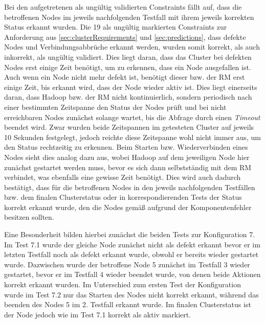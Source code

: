 Bei den aufgetretenen als ungültig validierten Constraints fällt auf, dass die betroffenen Nodes im jeweils nachfolgenden Testfall mit ihrem jeweils korrekten Status erkannt wurden.
Die 19 als ungültig markierten Constraints zur Anforderung aus \autoref{sec:clusterRequirements} und \autoref{sec:predictions}, dass defekte Nodes und Verbindungsabbrüche erkannt werden, wurden somit korrekt, als auch inkorrekt, als ungültig validiert.
Dies liegt daran, dass das Cluster bei defekten Nodes erst einige Zeit benötigt, um zu erkennen, dass ein Node ausgefallen ist.
Auch wenn ein Node nicht mehr defekt ist, benötigt dieser bzw. der \ac{RM} erst einige Zeit, bis erkannt wird, dass der Node wieder aktiv ist.
Dies liegt einerseits daran, dass Hadoop bzw. der \ac{RM} nicht kontinuierlich, sondern periodisch nach einer bestimmten Zeitspanne den Status der Nodes prüft und bei nicht erreichbaren Nodes zunächst solange wartet, bis die Abfrage durch einen \emph{Timeout} beendet wird.
Zwar wurden beide Zeitspannen im getesteten Cluster auf jeweils 10 Sekunden festgelegt, jedoch reichte diese Zeitspanne wohl nicht immer aus, um den Status rechtzeitig zu erkennen.
Beim Starten bzw. Wiederverbinden eines Nodes sieht dies analog dazu aus, wobei Hadoop auf dem jeweiligen Node hier zunächst gestartet werden muss, bevor es sich dann selbstständig mit dem \ac{RM} verbindet, was ebenfalls eine gewisse Zeit benötigt.
Dies wird auch dadurch bestätigt, dass für die betroffenen Nodes in den jeweils nachfolgenden Testfällen bzw. dem finalen Clusterstatus oder in korrespondierenden Tests der Status korrekt erkannt wurde, den die Nodes gemäß aufgrund der Komponentenfehler besitzen sollten.

Eine Besonderheit bilden hierbei zunächst die beiden Tests zur Konfiguration 7.
Im Test 7.1 wurde der gleiche Node zunächst nicht als defekt erkannt bevor er im letzten Testfall noch als defekt erkannt wurde, obwohl er bereits wieder gestartet wurde.
Dazwischen wurde der betroffene Node 5 zunächst im Testfall 3 wieder gestartet, bevor er im Testfall 4 wieder beendet wurde, von denen beide Aktionen korrekt erkannt wurden.
Im Unterschied zum ersten Test der Konfiguration wurde im Test 7.2 nur das Starten des Nodes nicht korrekt erkannt, während das beenden des Nodes 5 im 2. Testfall erkannt wurde.
Im finalen Clusterstatus ist der Node jedoch wie im Test 7.1 korrekt als aktiv markiert.

